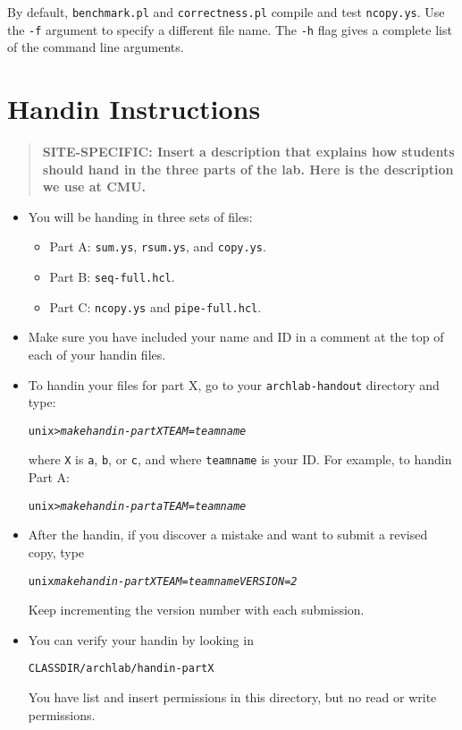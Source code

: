 \documentclass[11pt]{article}
\newenvironment{tty}%
{\small\begin{alltt}}%
{\end{alltt}}
\newenvironment{codefrag}%
{\small\begin{alltt}}%
{\end{alltt}%
}
\begin{document}
\begin{itemize}
By default, {\tt benchmark.pl} and {\tt correctness.pl} compile and
test {\tt ncopy.ys}. Use the {\tt -f} argument to specify a different
file name.  The {\tt -h} flag gives a complete list of the command
line arguments.

\end{itemize}


\section{Handin Instructions}

\begin{quote}
\bf SITE-SPECIFIC: Insert a description that explains how students
should hand in the three parts of the lab.  Here is the description
we use at CMU.
\end{quote}

\begin{itemize}
\item You will be handing in three sets of files:
\begin{itemize}
\item Part A: \texttt{sum.ys}, \texttt{rsum.ys}, and \texttt{copy.ys}. 
\item Part B: \texttt{seq-full.hcl}.
\item Part C: \texttt{ncopy.ys} and \texttt{pipe-full.hcl}.
\end{itemize}

\item Make sure you have included your name and ID in a comment at
the top of each of your handin files.

\item To handin your files for part X, go to your \texttt{archlab-handout}
directory and type:
\begin{tty}
    unix> {\em make handin-partX TEAM=teamname}
\end{tty}
where \texttt{X} is \texttt{a}, \texttt{b}, or \texttt{c}, and where
\texttt{teamname} is your  ID. For example, to handin Part A:
\begin{tty}
    unix> {\em make handin-parta TEAM=teamname}
\end{tty}


\item After the handin, if you discover a mistake and want to
submit a revised copy, type
\begin{tty}
    unix {\em make handin-partX TEAM=teamname VERSION=2}
\end{tty}
Keep incrementing the version number with each submission.

\item You can verify your handin by looking in 
\begin{codefrag}
    CLASSDIR/archlab/handin-partX
\end{codefrag}
You have list and insert permissions in this directory, but no
read or write permissions.
\end{itemize}
\end{document}
